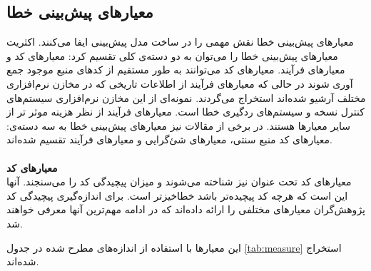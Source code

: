 \subsection{معیارهای پیش‌بینی خطا}
\label{subsec:metrics}
معیارهای پیش‌بینی خطا نقش مهمی را در ساخت مدل پیش‌بینی ایفا می‌کنند. اکثریت معیارهای پیش‌بینی خطا را می‌توان به دو دسته‌ی  کلی تقسیم کرد: معیارهای کد و معیارهای فرآیند. معیارهای کد می‌توانند به طور مستقیم از کدهای منبع موجود جمع آوری شوند در حالی که معیارهای فرآیند  از اطلاعات تاریخی که در مخازن نرم‌افزاری مختلف آرشیو شده‌اند استخراج می‌گردند. نمونه‌ای از این مخازن نرم‌افزاری سیستم‌های کنترل نسخه و سیستم‌های ردگیری خطا است. معیار‌های فرآیند از نظر هزینه موثر تر از سایر معیارها هستند\cite{arisholm2010systematic}. در برخی از مقالات نیز معیارهای  پیش‌بینی خطا به سه دسته‌ی: معیارهای کد منبع سنتی، معیارهای شئ‌گرایی و معیارهای فرآیند تقسیم شده‌اند\cite{radjenovic2013software}.\\\\
\textbf{معیارهای کد} \\

معیارهای کد تحت عنوان  نیز شناخته می‌شوند و میزان پیچیدگی کد را می‌سنجند.  آنها این است که هرچه کد پیچیده‌تر باشد خطا‌خیز‌تر است. برای اندازه‌گیری پیچیدگی کد پژوهش‌گران معیار‌های مختلفی را ارائه داده‌اند که در ادامه مهم‌ترین آنها معرفی خواهند شد. 

این معیارها با استفاده از اندازه‌های مطرح شده در جدول \ref{tab:measure}  استخراج شده‌اند. 

